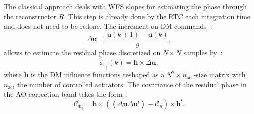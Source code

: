 \documentclass[12pt]{article}
\newcommand{\para}[1]{\left(#1\right)}
\newcommand{\aver}[1]{\left\langle #1 \right\rangle}
\newcommand{\epspara}{\boldsymbol{\varepsilon}_\parallel}
\begin{document}
The classical approach deals with WFS slopes for estimating the phase through the reconstructor $R$. This step is already done by the RTC each integration time and does not need to be redone. The increment on DM commands~:
\begin{equation}
	\Delta\boldsymbol{u}= \dfrac{\boldsymbol{u}(k+1) - \boldsymbol{u}(k)}{g},
\end{equation}
allows to estimate the residual phase discretized on $N\times N$ samples by~:
\begin{equation}
	\widehat{\phi}_{\varepsilon_\parallel}(k) = \boldsymbol{h}\times \Delta\boldsymbol{u},
\end{equation}
where $\boldsymbol{h}$ is the DM influence functions reshaped as a $N^2\times n_\text{act}$-size matrix with $n_\text{act}$ the number of controlled actuators. The covariance of the residual phase in the AO-correction band takes the form~:
\begin{equation}
	\mathcal{C}_{\epspara} = \boldsymbol{h}\times \para{\aver{\Delta\boldsymbol{u}\Delta\boldsymbol{u}^t} - \mathcal{C}_n}\times \boldsymbol{h}^t.
\end{equation}
\end{document}
